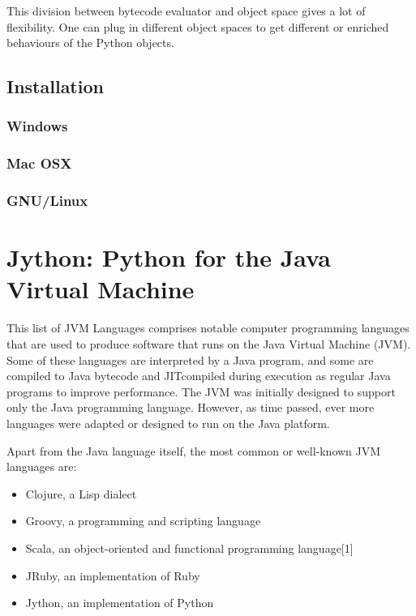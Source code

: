 This division between bytecode evaluator and object space gives a lot of flexibility. One can plug in different object spaces to get different or enriched behaviours of the Python objects.


\subsection{Installation}

\subsubsection{Windows}

\subsubsection{Mac OSX}

\subsubsection{GNU/Linux}



\newpage
\section{Jython: Python for the Java Virtual Machine}

This list of JVM Languages comprises notable computer
programming languages that are used to produce
software that runs on the Java Virtual Machine (JVM).
Some of these languages are interpreted by a Java program,
and some are compiled to Java bytecode and JITcompiled
during execution as regular Java programs to
improve performance.
The JVM was initially designed to support only the Java
programming language. However, as time passed, ever
more languages were adapted or designed to run on the
Java platform.

Apart from the Java language itself, the most common or
well-known JVM languages are:

\begin{itemize}		
	\item Clojure, a Lisp dialect
	\item Groovy, a programming and scripting language
	\item Scala, an object-oriented and functional programming language[1]
	\item JRuby, an implementation of Ruby
	\item Jython, an implementation of Python
\end{itemize}

